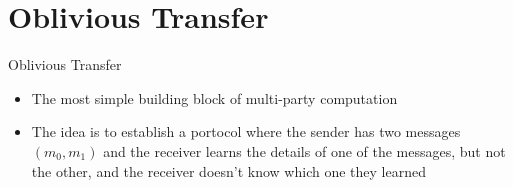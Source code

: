 \documentclass[handout]{beamer}
\begin{document}
\section{Oblivious Transfer}

\begin{frame}{Oblivious Transfer}
  \begin{itemize}
    \item \pause The most simple building block of multi-party computation
    \item \pause The idea is to establish a portocol where the sender has two messages \((m_0, m_1)\) and the receiver learns the details of one of the messages, but not the other, and the receiver doesn't know which one they learned
  \end{itemize}
\end{frame}
\end{document}
